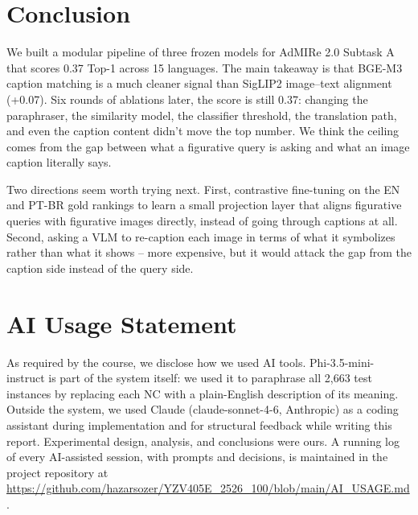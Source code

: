 \documentclass[11pt]{article}
\begin{document}
\section{Conclusion}

We built a modular pipeline of three frozen models for AdMIRe 2.0 Subtask A
that scores 0.37 Top-1 across 15 languages. The main takeaway is that BGE-M3
caption matching is a much cleaner signal than SigLIP2 image--text alignment
(+0.07). Six rounds of ablations later, the score is still 0.37: changing the
paraphraser, the similarity model, the classifier threshold, the translation
path, and even the caption content didn't move the top number. We think the
ceiling comes from the gap between what a figurative query is asking and what
an image caption literally says.

Two directions seem worth trying next. First, contrastive fine-tuning on the
EN and PT-BR gold rankings to learn a small projection layer that aligns
figurative queries with figurative images directly, instead of going through
captions at all. Second, asking a VLM to re-caption each image in terms of
what it symbolizes rather than what it shows -- more expensive, but it would
attack the gap from the caption side instead of the query side.

\section*{AI Usage Statement}
As required by the course, we disclose how we used AI tools. Phi-3.5-mini-instruct
is part of the system itself: we used it to paraphrase all 2{,}663 test
instances by replacing each NC with a plain-English description of its meaning.
Outside the system, we used Claude (claude-sonnet-4-6, Anthropic) as a coding
assistant during implementation and for structural feedback while writing this
report. Experimental design, analysis, and conclusions were ours. A running
log of every AI-assisted session, with prompts and decisions, is maintained
in the project repository at
\url{https://github.com/hazarsozer/YZV405E_2526_100/blob/main/AI_USAGE.md}.



\end{document}
